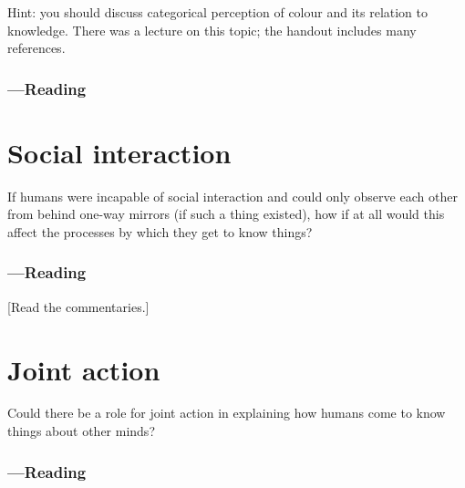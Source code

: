\documentclass[12pt,\papersize]{extarticle}
\begin{document}
Hint: you should discuss categorical perception of colour and its relation to knowledge.  There was a lecture on this topic; the handout includes many references.

\subsubsection{---Reading}









\section{Social interaction}
If humans were incapable of social interaction and could only observe each other from behind one-way mirrors (if such a thing existed), how if at all would this affect the processes by which they get to know things?

\subsubsection{---Reading}



 [Read the commentaries.]




\section{Joint action}

Could there be a role for joint action in explaining how humans come to know things about other minds?

\subsubsection{---Reading}




\end{document}
